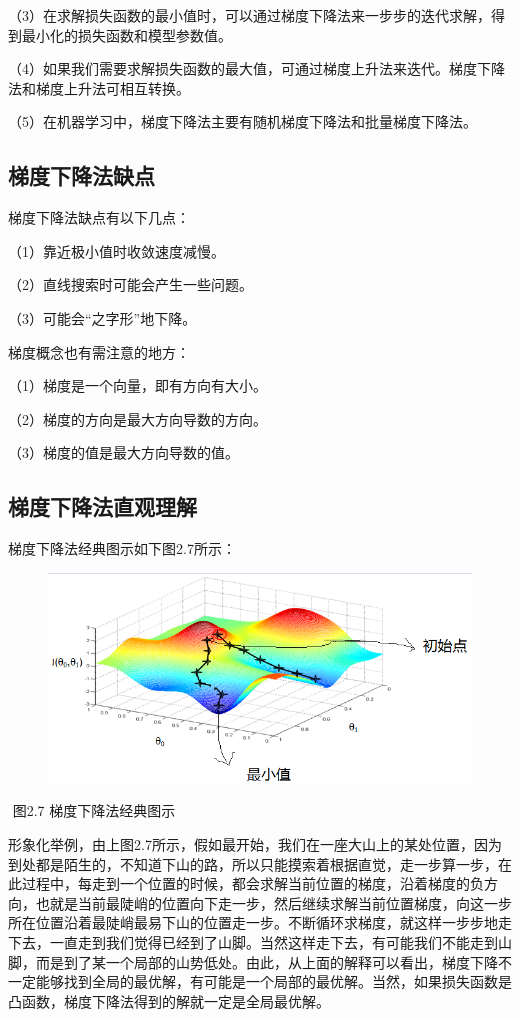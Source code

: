 （3）在求解损失函数的最小值时，可以通过梯度下降法来一步步的迭代求解，得到最小化的损失函数和模型参数值。

（4）如果我们需要求解损失函数的最大值，可通过梯度上升法来迭代。梯度下降法和梯度上升法可相互转换。

（5）在机器学习中，梯度下降法主要有随机梯度下降法和批量梯度下降法。

\subsection{梯度下降法缺点}\label{ux68afux5ea6ux4e0bux964dux6cd5ux7f3aux70b9}

梯度下降法缺点有以下几点：

（1）靠近极小值时收敛速度减慢。

（2）直线搜索时可能会产生一些问题。

（3）可能会``之字形''地下降。

梯度概念也有需注意的地方：

（1）梯度是一个向量，即有方向有大小。

（2）梯度的方向是最大方向导数的方向。

（3）梯度的值是最大方向导数的值。

\subsection{梯度下降法直观理解}\label{ux68afux5ea6ux4e0bux964dux6cd5ux76f4ux89c2ux7406ux89e3}

梯度下降法经典图示如下图2.7所示：

\begin{figure}
\centering
\includegraphics{./img/ch2/2.25/1.png}
\caption{}
\end{figure}

​ 图2.7 梯度下降法经典图示

​
形象化举例，由上图2.7所示，假如最开始，我们在一座大山上的某处位置，因为到处都是陌生的，不知道下山的路，所以只能摸索着根据直觉，走一步算一步，在此过程中，每走到一个位置的时候，都会求解当前位置的梯度，沿着梯度的负方向，也就是当前最陡峭的位置向下走一步，然后继续求解当前位置梯度，向这一步所在位置沿着最陡峭最易下山的位置走一步。不断循环求梯度，就这样一步步地走下去，一直走到我们觉得已经到了山脚。当然这样走下去，有可能我们不能走到山脚，而是到了某一个局部的山势低处。
​
由此，从上面的解释可以看出，梯度下降不一定能够找到全局的最优解，有可能是一个局部的最优解。当然，如果损失函数是凸函数，梯度下降法得到的解就一定是全局最优解。

